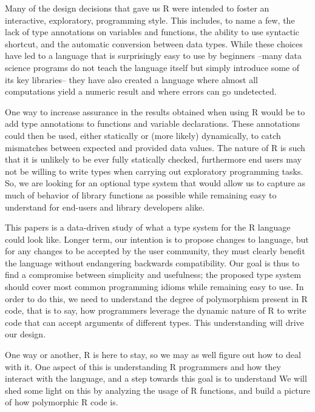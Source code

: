\documentclass[acmsmall,10pt,review,anonymous]{acmart}\settopmatter{printfolios=true,printccs=false,printacmref=false}
\begin{document}
Many of the design decisions that gave us R were intended to foster an
interactive, exploratory, programming style. This includes, to name a few,
the lack of type annotations on variables and functions, the ability to use
syntactic shortcut, and the automatic conversion between data types.  While
these choices have led to a language that is surprisingly easy to use by
beginners --many data science programs do not teach the language itself but
simply introduce some of its key libraries-- they have also created a
language where almost all computations yield a numeric result and where
errors can go undetected. 

One way to increase assurance in the results obtained when using R would be
to add type annotations to functions and variable declarations. These
annotations could then be used, either statically or (more likely)
dynamically, to catch mismatches between expected and provided data values.
The nature of R is such that it is unlikely to be ever fully statically
checked, furthermore end users may not be willing to write types when
carrying out exploratory programming tasks. So, we are looking for an
optional type system that would allow us to capture as much of behavior of
library functions as possible while remaining easy to understand for
end-users and library developers alike.

This papers is a data-driven study of what a type system for the R language
could look like. Longer term, our intention is to propose changes to
language, but for any changes to be accepted by the user community, they
must clearly benefit the language without endangering backwards
compatibility. Our goal is thus to find a compromise between simplicity and
usefulness; the proposed type system should cover most common programming
idioms while remaining easy to use. In order to do this, we need to
understand the degree of polymorphism present in R code, that is to say, how
programmers leverage the dynamic nature of R to write code that can accept
arguments of different types.  This understanding will drive our design.



One way or another, R is here to stay, so we may as well figure out how to
deal with it.  One aspect of this is understanding R programmers and how
they interact with the language, and a step towards this goal is to
understand   We will shed some light on
this by analyzing the usage of R functions, and build a picture of how
polymorphic R code is.
\end{document}
